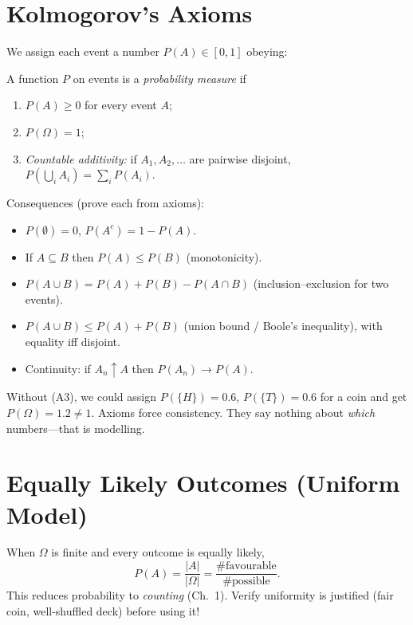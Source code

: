 \section{Kolmogorov's Axioms}
\label{sec:axioms}
We assign each event a number $P(A)\in[0,1]$ obeying:

\begin{definition} A function $P$ on events is a \emph{probability measure} if
\begin{enumerate}[label=(A\arabic*)]
    \item $P(A)\ge0$ for every event $A$;
    \item $P(\Omega)=1$;
    \item \emph{Countable additivity:} if $A_1,A_2,\dots$ are pairwise disjoint, $P(\bigcup_i A_i)=\sum_i P(A_i)$.
\end{enumerate}
\end{definition}

Consequences (prove each from axioms):
\begin{itemize}
    \item $P(\emptyset)=0$, $P(A^c)=1-P(A)$.
    \item If $A\subseteq B$ then $P(A)\le P(B)$ (monotonicity).
    \item $P(A\cup B)=P(A)+P(B)-P(A\cap B)$ (inclusion--exclusion for two events).
    \item $P(A\cup B)\le P(A)+P(B)$ (union bound / Boole's inequality), with equality iff disjoint.
    \item Continuity: if $A_n\uparrow A$ then $P(A_n)\to P(A)$.
\end{itemize}

\begin{example} Without (A3), we could assign $P(\{H\})=0.6$, $P(\{T\})=0.6$ for a coin and get $P(\Omega)=1.2\ne1$. Axioms force consistency. They say nothing about \emph{which} numbers---that is modelling.
\end{example}

\section{Equally Likely Outcomes (Uniform Model)}
\label{sec:uniform}
When $\Omega$ is finite and every outcome is equally likely,
\[
P(A)=\frac{|A|}{|\Omega|}=\frac{\text{\# favourable}}{\text{\# possible}}.
\]
This reduces probability to \emph{counting} (Ch.~1). Verify uniformity is justified (fair coin, well-shuffled deck) before using it!

